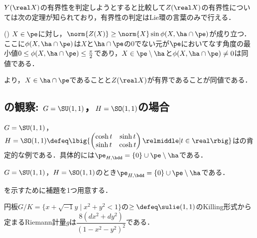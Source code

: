 $Y(\real X) $の有界性を判定しようとすると比較して$Z(\real X) $の有界性については次の定理が知られており，有界性の判定はLie環の言葉のみで行える．

\begin{thm}(\cite[Lemmma~5.4]{kob97})\label{thm:kob97}
  $X\in \pe$に対し，$\norm{Z(X)}\geq \norm{X} \sin\phi(X, \ha\cap\pe)$が成り立つ．ここに$\phi(X,\ha\cap \pe) $は$X$と$\ha\cap \pe$の0でない元が$\pe$においてなす角度の最小値${0\leq \phi(X,\ha\cap \pe) \leq \frac{\pi}{2}} $であり，$X\in \pe\setminus \ha $と$ \phi(X,\ha\cap \pe)\neq 0 $は同値である．
\end{thm}

より，$X\in \ha\cap\pe $であることと$Z(\real X) $が有界であることが同値である．


\subsection{の観察: $G = \SU(1,1) $，$H = \SO(1,1) $の場合}

$G = \SU(1,1) $，$H = \SO(1,1) \defeq\lbig\{
\begin{pmatrix}
  \cosh t & \sinh t\\ \sinh t & \cosh t
\end{pmatrix}
\relmiddle| t\in \real \rbig\} $はの肯定的な例である．具体的には$\pe_{H,\bdd} = \{0\}\cup \pe\setminus\ha $である．

\begin{prop}\label{prop:prob-eg}
  $G = \SU(1,1) $，$H = \SO(1,1) $のとき$\pe_{H,\bdd} = \{0\}\cup \pe\setminus\ha $である．
\end{prop}

を示すために補題を1つ用意する．
\begin{lem}\label{lem:riem-metric-su11}
  {\Poincare}円板${G/K =\{x+\sqrt{-1}y\mid  x^2 + y^2 < 1 \} }$の$\ge\defeq \sulie(1,1)$のKilling形式から定まるRiemann計量$g$は$ \dfrac{8(dx^2 + dy^2)}{(1 - x^2 - y^2)^2} $である．
\end{lem}

